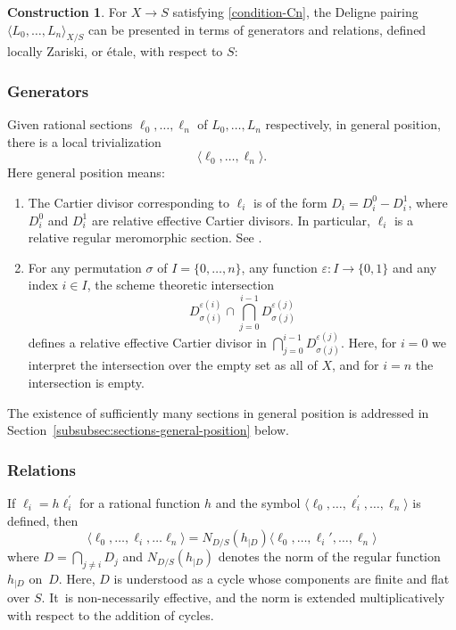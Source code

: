 \documentclass[JEP,XML,SOM,Unicode,published]{cedram}
\let\epsilon\varepsilon
\theoremstyle{plain}
\theoremstyle{definition}
\newtheorem*{construction}{Construction}
\begin{document}
\begin{construction} For $X\to S$ satisfying \eqref{condition-Cn}, the Deligne pairing $\langle L_{0},\ldots,L_{n}\rangle_{X/S}$ can be presented in terms of generators and relations, defined locally Zariski, or étale, with respect to $S$:
\subsubsection*{Generators}
Given rational sections $\ell_{0}, \ldots, \ell_n$ of $L_{0},\ldots,L_{n}$ respectively, in general position, there is a local trivialization\vspace*{-3pt}\enlargethispage{.5\baselineskip}
\begin{equation}\label{def:symbol}
\langle \ell_{0}, \ldots, \ell_n \rangle.
\end{equation} Here general position means:
\begin{enumerate}
\item\label{item:generators-1} The Cartier divisor corresponding to $\ell_i$ is of the form $D_{i}=D_i^0 - D_i^1$, where $D_i^0 $ and $D_i^1$ are relative effective Cartier divisors. In particular, $\ell_{i}$ is a relative regular meromorphic section. See \cite[]{EGAIV4}.
\item\label{item:generators-2} For any permutation $\sigma$ of $I=\lbrace 0,\ldots,n\rbrace$, any function $\epsilon: I \to \{0,1 \}$ and any index $i\in I$, the scheme theoretic intersection\vspace*{-3pt}
\begin{displaymath}
D_{\sigma(i)}^{\epsilon(i)} \cap \bigcap_{j=0}^{i-1} D_{\sigma(j)}^{\epsilon(j)}
\end{displaymath}
defines a relative effective Cartier divisor in $\bigcap_{j=0}^{i-1} D_{\sigma(j)}^{\epsilon(j)}$. Here, for $i=0$ we interpret the intersection over the empty set as all of $X$, and for $i=n$ the intersection is empty.
\end{enumerate}
The existence of sufficiently many sections in general position is addressed in Section~\ref{subsubsec:sections-general-position} below.

\subsubsection*{Relations}
If $\ell_i = h \ell_i^{\prime}$ for a rational function $h$ and the symbol $\langle\ell_{0},\ldots,\ell_{i}^{\prime},\ldots,\ell_{n}\rangle$ is defined, then\vspace*{-3pt}
\begin{equation}\label{eq:relationElkikDucrot}
\langle \ell_{0}, \ldots, \ell_i,\ldots \ell_n \rangle = N_{D/S}(h_{\mid D}) \langle \ell_{0}, \ldots, \ell_i', \ldots, \ell_n \rangle
\end{equation}
where $D = \bigcap_{j \neq i} D_j $ and $N_{D/S}(h_{\mid D})$ denotes the norm of the regular function $h_{\mid D}$ on~$D$. Here, $D$ is understood as a cycle whose components are finite and flat over $S$. It~is non-necessarily effective, and the norm is extended multiplicatively with respect to the addition of cycles.
\end{construction}
\end{document}
